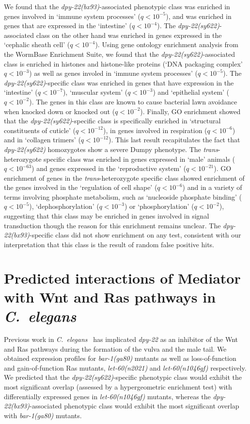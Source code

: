 \documentclass[9pt,twocolumn,twoside]{gsajnl}
\newcommand{\qval}[1]{$q<10^{-#1}$}
\newcommand{\cel}{\emph{C.~elegans}}
\newcommand{\gene}[1]{\mbox{\emph{#1}}}
\newcommand{\dpy}[1]{\gene{dpy-22#1}}
\newcommand{\bx}{\dpy{(bx93)}}
\newcommand{\sy}{\dpy{(sy622)}}
\begin{document}
We found that the \bx{}-associated phenotypic class was enriched in genes
involved in `immune system processes' (\qval{5}), and was enriched in genes that
are expressed in the `intestine' (\qval{4}). The \sy{}-associated class on the
other hand was enriched in genes expressed in the `cephalic sheath cell'
(\qval{4}). Using gene ontology enrichment analysis from the WormBase Enrichment
Suite, we found that the \sy{}-associated class is enriched in histones and
histone-like proteins (`DNA packaging complex' \qval{3}) as well as genes
involed in `immune system processes' (\qval{5}). The \sy{}-specific class was
enriched in genes that have expression in the `intestine' (\qval{7}), `muscular
system' (\qval{3}) and `epithelial system' (\qval{2}). The genes in this class
are known to cause bacterial lawn avoidance when knocked down or knocked out
(\qval{2}). Finally, GO enrichment showed that the \sy{}-specific class is
specifically enriched in `structural constituents of cuticle' (\qval{12}),
in genes involved in respiration (\qval{6}) and in `collagen trimers'
(\qval{12}). This last result recapitulates the fact that \sy{} homozygotes show
a severe Dumpy phenotype. The \emph{trans}-heterozygote specific class was
enriched in genes expressed in `male' animals (\qval{63}) and genes expressed in
the `reproductive system' (\qval{21}). GO enrichment of genes in the
\emph{trans}-heterozygote specific class showed enrichment of the genes involved
in the `regulation of cell shape' (\qval{6}) and in a variety of terms involving
phosphate metabolism, such as `nucleoside phosphate binding' (\qval{5}),
`dephosphorylation' (\qval{3}) or `phosphorylation' (\qval{2}), suggesting that
this class may be enriched in genes involved in signal transduction though the
reason for this enrichment remains unclear. The \bx{}-specific class did not
show enrichment on any test, consistent with our interpretation that this class
is the result of random false positive hits.

\section*{Predicted interactions of Mediator with Wnt and Ras pathways in
          \cel{}}
Previous work in \cel{}~\citep{Moghal2003,Zhang2000} has implicated \dpy{} as an
inhibitor of the Wnt and Ras pathways during the formation of the vulva and the
male tail. We obtained expression profiles for \gene{bar-1(ga80)} mutants as
well as loss-of-function and gain-of-function Ras mutants, \gene{let-60(n2021)}
and \gene{let-60(n1046gf)} respectively. We predicted that the \sy{}-specific
phenotypic class would exhibit the most significant overlap (assessed by a
hypergeometric enrichment test) with differentially expressed genes in
\gene{let-60(n1046gf)} mutants, whereas the \bx{}-associated phenotypic class
would exhibit the most significant overlap with \gene{bar-1(ga80)} mutants.
\end{document}
